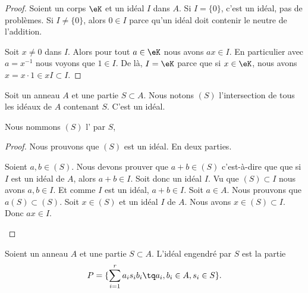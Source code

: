 \begin{proof}
	Soient un corps \( \eK\) et un idéal \( I\) dans \( A\). Si \( I=\{ 0 \}\), c'est un idéal, pas de problèmes. Si \( I\neq\{ 0 \}\), alors \( 0\in I\) parce qu'un idéal doit contenir le neutre de l'addition.

	Soit \( x\neq 0\) dans \( I\). Alors pour tout \( a\in \eK\) nous avons \( ax\in I\). En particulier avec \( a=x^{-1}\) nous voyons que \( 1\in I\). De là, \( I=\eK\) parce que si \( x\in \eK\), nous avons \( x=x\cdot 1\in xI\subset I\).
\end{proof}

\begin{propositionDef}  \label{DefSKTooOTauAR}
	Soit un anneau \( A\) et une partie \( S\subset A\). Nous notons \( (S)\) l'intersection de tous les idéaux de \( A\) contenant \( S\). C'est un idéal.

	Nous nommons \( (S)\) l' par \( S\),
\end{propositionDef}

\begin{proof}
	Nous prouvons que \( (S)\) est un idéal. En deux parties.
	\begin{subproof}
		\spitem[Somme]
		Soient \( a,b\in (S)\). Nous devons prouver que \( a+b\in (S)\) c'est-à-dire que que si \( I\) est un idéal de \( A\), alors \( a+b\in I\). Soit donc un idéal \( I\). Vu que \( (S)\subset I\) nous avons \( a,b\in I\). Et comme \( I\) est un idéal, \( a+b\in I\).
		\spitem[\( a(S)\subset (S)\)]
		Soit \( a\in A\). Nous prouvons que \( a(S)\subset (S)\). Soit \( x\in (S)\) et un idéal \( I\) de \( A\). Nous avons \( x\in (S)\subset I\). Donc \( ax\in I\).
	\end{subproof}
\end{proof}

\begin{proposition}	\label{PROPooDTYUooJPzPZV}
	Soient un anneau \( A\) et une partie \( S\subset A\). L'idéal engendré par \( S\) est la partie
	\begin{equation}
		P=\{ \sum_{i=1}^ra_is_ib_i \tq a_i,b_i\in A, s_i\in S \}.
	\end{equation}
\end{proposition}

